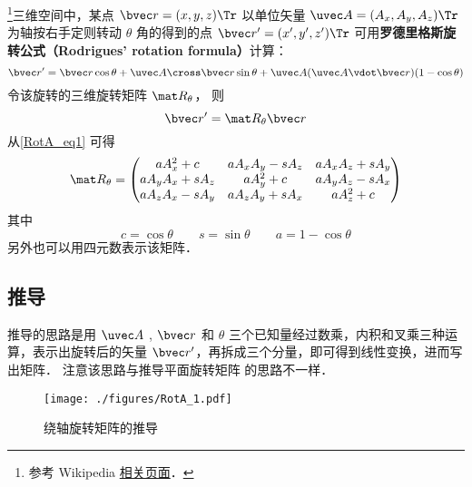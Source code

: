 

\footnote{参考 Wikipedia \href{https://en.wikipedia.org/wiki/Rodrigues'_rotation_formula}{相关页面}．}三维空间中，某点 $\bvec r=(x,y,z)\Tr$ 以单位矢量 $\uvec A=(A_x, A_y, A_z)\Tr$ 为轴按右手定则转动 $\theta$ 角的得到的点 $\bvec r'=(x',y',z')\Tr$ 可用\textbf{罗德里格斯旋转公式（Rodrigues' rotation formula）}计算：
\begin{equation}\label{RotA_eq1}
\bvec r' = \bvec r \cos\theta + \uvec A \cross \bvec r \sin\theta + \uvec A (\uvec A \vdot \bvec r) (1 - \cos\theta)
\end{equation}
令该旋转的三维旋转矩阵 $\mat R_\theta$， 则
\begin{equation}\label{RotA_eq2}
\bvec r' = \mat R_\theta \bvec r
\end{equation}
从\autoref{RotA_eq1} 可得
\begin{equation}
\mat R_\theta =
\begin{pmatrix}
a A_x^2 + c & a A_x A_y - s A_z & a A_x A_z + s A_y\\
a A_y A_x + s A_z & a A_y^2 + c & a A_y A_z - s A_x\\
a A_z A_x - s A_y & a A_z A_y + s A_x & a A_z^2 + c
\end{pmatrix}\end{equation}
其中
\begin{equation}
c = \cos\theta \qquad s = \sin\theta \qquad a = 1 - \cos\theta
\end{equation}
另外也可以用四元数表示该矩阵．

\subsection{推导}
推导的思路是用 $\uvec A$ , $\bvec r$ 和 $\theta $ 三个已知量经过数乘，内积和叉乘三种运算，表示出旋转后的矢量 $\bvec r'$，再拆成三个分量，即可得到线性变换，进而写出矩阵． 注意该思路与推导平面旋转矩阵 的思路不一样．
\begin{figure}[ht]
\centering
\texttt{[image: ./figures/RotA\_1.pdf]}
\caption{绕轴旋转矩阵的推导}
\end{figure} 

